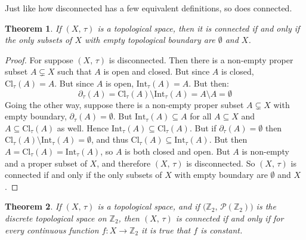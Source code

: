 \documentclass{article}
\theoremstyle{plain}
\newtheorem{theorem}{Theorem}[section]
\theoremstyle{normal}
\begin{document}
        Just like how disconnected has a few equivalent definitions, so does
        connected.
        \begin{theorem}
            If $(X,\,\tau)$ is a topological space, then it is connected if and
            only if the only subsets of $X$ with empty topological boundary are
            $\emptyset$ and $X$.
        \end{theorem}
        \begin{proof}
            For suppose $(X,\,\tau)$ is disconnected. Then there is a non-empty
            proper subset $A\subsetneq{X}$ such that $A$ is open and closed.
            But since $A$ is closed, $\textrm{Cl}_{\tau}(A)=A$. But since
            $A$ is open, $\textrm{Int}_{\tau}(A)=A$. But then:
            \begin{equation}
                \partial_{\tau}(A)
                =\textrm{Cl}_{\tau}(A)\setminus\textrm{Int}_{\tau}(A)
                =A\setminus{A}
                =\emptyset
            \end{equation}
            Going the other way, suppose there is a non-empty proper subset
            $A\subsetneq{X}$ with empty boundary,
            $\partial_{\tau}(A)=\emptyset$. But
            $\textrm{Int}_{\tau}(A)\subseteq{A}$ for all $A\subseteq{X}$ and
            $A\subseteq\textrm{Cl}_{\tau}(A)$ as well. Hence
            $\textrm{Int}_{\tau}(A)\subseteq\textrm{Cl}_{\tau}(A)$. But if
            $\partial_{\tau}(A)=\emptyset$ then
            $\textrm{Cl}_{\tau}(A)\setminus\textrm{Int}_{\tau}(A)=\emptyset$,
            and thus $\textrm{Cl}_{\tau}(A)\subseteq\textrm{Int}_{\tau}(A)$.
            But then $A=\textrm{Cl}_{\tau}(A)=\textrm{Int}_{\tau}(A)$, so
            $A$ is both closed and open. But $A$ is non-empty and a proper
            subset of $X$, and therefore $(X,\,\tau)$ is disconnected. So
            $(X,\,\tau)$ is connected if and only if the only subsets of $X$
            with empty boundary are $\emptyset$ and $X$.
        \end{proof}
        \begin{theorem}
            If $(X,\,\tau)$ is a topological space, and if
            $\big(\mathbb{Z}_{2},\,\mathcal{P}(\mathbb{Z}_{2})\big)$ is the
            discrete topological space on $\mathbb{Z}_{2}$, then $(X,\,\tau)$
            is connected if and only if for every continuous function
            $f:X\rightarrow\mathbb{Z}_{2}$ it is true that $f$ is constant.
        \end{theorem}
\end{document}
